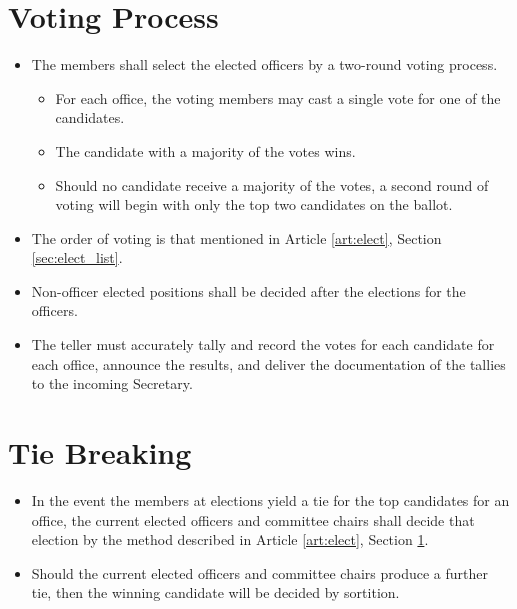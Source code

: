 \documentclass[12pt]{constitution}
\begin{document}
\section{Voting Process}
\label{sec:elect_vote}
\begin{itemize}
    \item The members shall select the elected officers by a two-round voting process.
    \begin{itemize}
        \item For each office, the voting members may cast a single vote for one of the candidates.
        \item The candidate with a majority of the votes wins.
        \item Should no candidate receive a majority of the votes, a second round of voting will begin with only the top two candidates on the ballot.
    \end{itemize}
    \item The order of voting is that mentioned in Article \ref{art:elect}, Section \ref{sec:elect_list}.
    \item Non-officer elected positions shall be decided after the elections for the officers.
    \item The teller must accurately tally and record the votes for each candidate for each office, announce the results, and deliver the documentation of the tallies to the incoming Secretary.
\end{itemize}

\section{Tie Breaking}
\label{sec:elect_tie}
\begin{itemize}
    \item In the event the members at elections yield a tie for the top candidates for an office, the current elected officers and committee chairs shall decide that election by the method described in Article \ref{art:elect}, Section \ref{sec:elect_vote}.
    \item Should the current elected officers and committee chairs produce a further tie, then the winning candidate will be decided by sortition.
\end{itemize}
\end{document}
